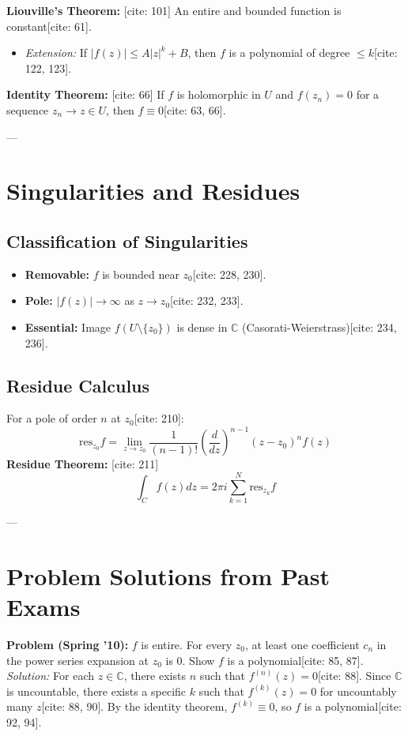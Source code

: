 \documentclass[11pt]{article}
\begin{document}
\textbf{Liouville's Theorem:} [cite: 101]
An entire and bounded function is constant[cite: 61].
\begin{itemize}
    \item \textit{Extension:} If $|f(z)| \le A|z|^k + B$, then $f$ is a polynomial of degree $\le k$[cite: 122, 123].
\end{itemize}

\textbf{Identity Theorem:} [cite: 66]
If $f$ is holomorphic in $U$ and $f(z_n) = 0$ for a sequence $z_n \to z \in U$, then $f \equiv 0$[cite: 63, 66].

---

\section{Singularities and Residues}

\subsection*{Classification of Singularities}
\begin{itemize}
    \item \textbf{Removable:} $f$ is bounded near $z_0$[cite: 228, 230].
    \item \textbf{Pole:} $|f(z)| \to \infty$ as $z \to z_0$[cite: 232, 233].
    \item \textbf{Essential:} Image $f(U \setminus \{z_0\})$ is dense in $\mathbb{C}$ (Casorati-Weierstrass)[cite: 234, 236].
\end{itemize}

\subsection*{Residue Calculus}
For a pole of order $n$ at $z_0$[cite: 210]:
$$\text{res}_{z_0} f = \lim_{z \to z_0} \frac{1}{(n-1)!} \left(\frac{d}{dz}\right)^{n-1} (z-z_0)^n f(z)$$
\textbf{Residue Theorem:} [cite: 211]
$$\int_{C} f(z) dz = 2\pi i \sum_{k=1}^N \text{res}_{z_k} f$$

---

\section{Problem Solutions from Past Exams}

\textbf{Problem (Spring '10):} $f$ is entire. For every $z_0$, at least one coefficient $c_n$ in the power series expansion at $z_0$ is 0. Show $f$ is a polynomial[cite: 85, 87].
\textit{Solution:} For each $z \in \mathbb{C}$, there exists $n$ such that $f^{(n)}(z) = 0$[cite: 88]. Since $\mathbb{C}$ is uncountable, there exists a specific $k$ such that $f^{(k)}(z) = 0$ for uncountably many $z$[cite: 88, 90]. By the identity theorem, $f^{(k)} \equiv 0$, so $f$ is a polynomial[cite: 92, 94].
\end{document}
